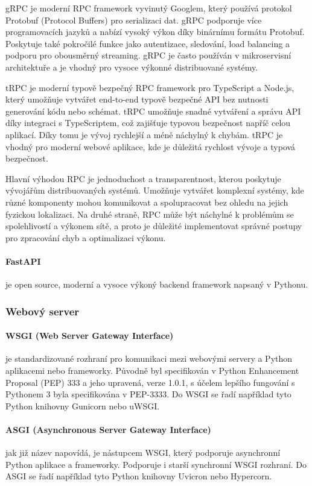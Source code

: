 \documentclass[12pt, a4paper]{article}
\begin{document}
gRPC je moderní RPC framework vyvinutý Googlem, který používá protokol Protobuf (Protocol Buffers) pro serializaci dat. gRPC podporuje více programovacích jazyků a nabízí vysoký výkon díky binárnímu formátu Protobuf. Poskytuje také pokročilé funkce jako autentizace, sledování, load balancing a podporu pro obousměrný streaming. gRPC je často používán v mikroservisní architektuře a je vhodný pro vysoce výkonné distribuované systémy.
\cite{grpc_authors_introduction_nodate}
\cite{google_llc_overview_nodate}

tRPC je moderní typově bezpečný RPC framework pro TypeScript a Node.js, který umožňuje vytvářet end-to-end typově bezpečné API bez nutnosti generování kódu nebo schémat. tRPC umožňuje snadné vytváření a správu API díky integraci s TypeScriptem, což zajišťuje typovou bezpečnost napříč celou aplikací. Díky tomu je vývoj rychlejší a méně náchylný k chybám. tRPC je vhodný pro moderní webové aplikace, kde je důležitá rychlost vývoje a typová bezpečnost.
\cite{johansson_trpc_nodate}

Hlavní výhodou RPC je jednoduchost a transparentnost, kterou poskytuje vývojářům distribuovaných systémů. Umožňuje vytvářet komplexní systémy, kde různé komponenty mohou komunikovat a spolupracovat bez ohledu na jejich fyzickou lokalizaci. Na druhé straně, RPC může být náchylné k problémům se spolehlivostí a výkonem sítě, a proto je důležité implementovat správné postupy pro zpracování chyb a optimalizaci výkonu.

\paragraph{FastAPI} je open source, moderní a vysoce výkoný backend framework napsaný v Pythonu.
\subsubsection{Webový server}
\paragraph{WSGI (Web Server Gateway Interface)}
je standardizované rozhraní pro komunikaci mezi webovými servery a Python aplikacemi nebo frameworky. Původně byl specifikován v Python Enhancement Proposal (PEP) 333 a jeho upravená, verze 1.0.1, s účelem lepšího fungování s Pythonem 3 byla specifikována v PEP-3333. Do WSGI se řadí například tyto Python knihovny Gunicorn nebo uWSGI.
\cite{eby_pep_2010}
\paragraph{ASGI (Asynchronous Server Gateway Interface)}
jak již název napovídá, je nástupcem WSGI, který podporuje asynchronní Python aplikace a frameworky. Podporuje i starší synchronní WSGI rozhraní. Do ASGI se řadí například tyto Python knihovny Uvicron nebo Hypercorn.
\cite{asgi_team_introduction_nodate}
\end{document}
